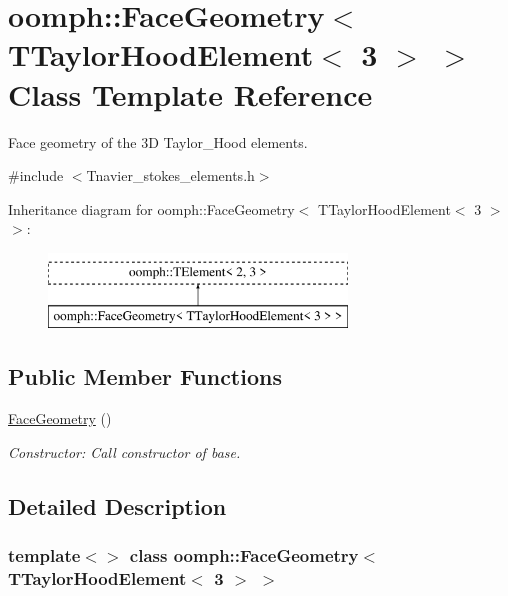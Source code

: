 \hypertarget{classoomph_1_1FaceGeometry_3_01TTaylorHoodElement_3_013_01_4_01_4}{}\section{oomph\+:\+:Face\+Geometry$<$ T\+Taylor\+Hood\+Element$<$ 3 $>$ $>$ Class Template Reference}
\label{classoomph_1_1FaceGeometry_3_01TTaylorHoodElement_3_013_01_4_01_4}


Face geometry of the 3D Taylor\+\_\+\+Hood elements.  




{\ttfamily \#include $<$Tnavier\+\_\+stokes\+\_\+elements.\+h$>$}

Inheritance diagram for oomph\+:\+:Face\+Geometry$<$ T\+Taylor\+Hood\+Element$<$ 3 $>$ $>$\+:\begin{figure}[H]
\begin{center}
\leavevmode
\includegraphics[height=2.000000cm]{classoomph_1_1FaceGeometry_3_01TTaylorHoodElement_3_013_01_4_01_4}
\end{center}
\end{figure}
\subsection*{Public Member Functions}
\begin{DoxyCompactItemize}
\item 
\hyperlink{classoomph_1_1FaceGeometry_3_01TTaylorHoodElement_3_013_01_4_01_4_a4cb78d484cdadaaf55ca5a0fc8d3815b}{Face\+Geometry} ()
\begin{DoxyCompactList}\small\item\em Constructor\+: Call constructor of base. \end{DoxyCompactList}\end{DoxyCompactItemize}


\subsection{Detailed Description}
\subsubsection*{template$<$$>$\newline
class oomph\+::\+Face\+Geometry$<$ T\+Taylor\+Hood\+Element$<$ 3 $>$ $>$}


